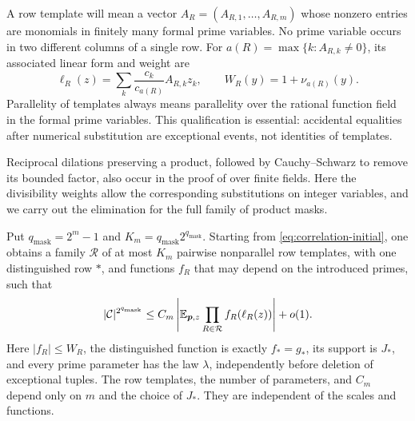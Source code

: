 A row template will mean a vector $A_R=(A_{R,1},\ldots,A_{R,m})$ whose
nonzero entries are monomials in finitely many formal prime variables.
No prime variable occurs in two different columns of a single row.
For $a(R)=\max\{k:A_{R,k}\ne0\}$, its associated linear form and weight
are
\begin{equation}
 \ell_R(z)=\sum_k\frac{c_k}{c_{a(R)}}A_{R,k}z_k,
 \qquad W_R(y)=1+\nu_{a(R)}(y).
 \label{eq:correlation-row-template}
\end{equation}
Parallelity of templates always means parallelity over the rational
function field in the formal prime variables.  This qualification is
essential: accidental equalities after numerical substitution are
exceptional events, not identities of templates.

Reciprocal dilations preserving a product, followed by
Cauchy--Schwarz to remove its bounded factor, also occur in the proof
of \cite[Proposition~2.4]{GreenSanders} over finite fields.
Here the divisibility weights allow the corresponding substitutions
on integer variables, and we carry out the elimination for the full
family of product masks.

\begin{lemma}
\label{lem:mask-removal}
Put $q_{\mathrm{mask}}=2^m-1$ and $K_m=q_{\mathrm{mask}}2^{q_{\mathrm{mask}}}$.  Starting from
\eqref{eq:correlation-initial}, one obtains a family $\mathcal R$ of at
most $K_m$ pairwise nonparallel row templates, with one distinguished
row $*$, and functions $f_R$ that may depend on the introduced primes,
such that
\begin{equation}
 |\mathcal C|^{2^{q_{\mathrm{mask}}}}
 \le C_m\left|\mathbb E_{\boldsymbol p,z}
                 \prod_{R\in\mathcal R}f_R(\ell_R(z))\right|+o(1).
 \label{eq:mask-removal-output}
\end{equation}
Here $|f_R|\le W_R$, the distinguished function is exactly $f_*=g_*$,
its support is $J_*$, and every prime parameter has the law $\lambda$,
independently before deletion of exceptional tuples.
The row templates, the number of parameters, and $C_m$ depend only on
$m$ and the choice of $J_*$.  They are independent of the scales and
functions.
\end{lemma}

